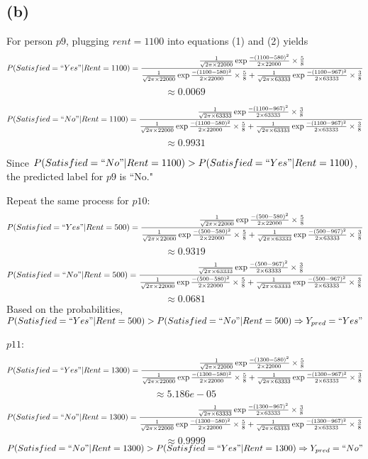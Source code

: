 \documentclass{article}
\begin{document}
\subsection{(b)}
For person $p9$, plugging $rent = 1100$ into equations (1) and (2) yields 
\[
P(Satisfied=``Yes"|Rent=1100) = \frac{\frac{1}{\sqrt{2\pi\times22000}}\exp{\frac{-(1100-580)^2}{2\times22000}}\times \frac{5}{8}}{\frac{1}{\sqrt{2\pi\times22000}}\exp{\frac{-(1100-580)^2}{2\times22000}}\times\frac{5}{8} + \frac{1}{\sqrt{2\pi\times63333}}\exp{\frac{-(1100-967)^2}{2\times63333}}\times\frac{3}{8}} \]\[\approx 0.0069 \]

\[P(Satisfied=``No"|Rent=1100) 
= \frac{\frac{1}{\sqrt{2\pi\times63333}}\exp{\frac{-(1100-967)^2}{2\times63333}}\times\frac{3}{8}}{ \frac{1}{\sqrt{2\pi\times22000}}\exp{\frac{-(1100-580)^2}{2\times22000}}\times\frac{5}{8} + \frac{1}{\sqrt{2\pi\times63333}}\exp{\frac{-(1100-967)^2}{2\times63333}}\times\frac{3}{8}}
\]\[\approx 0.9931\] 
\par Since $P(Satisfied=``No"|Rent=1100) > P(Satisfied=``Yes"|Rent=1100)$, the predicted label for $p9$ is ``No." 
\par Repeat the same process for $p10$:
\[
P(Satisfied=``Yes"|Rent=500) = \frac{\frac{1}{\sqrt{2\pi\times22000}}\exp{\frac{-(500-580)^2}{2\times22000}}\times \frac{5}{8}}{\frac{1}{\sqrt{2\pi\times22000}}\exp{\frac{-(500-580)^2}{2\times22000}}\times\frac{5}{8} + \frac{1}{\sqrt{2\pi\times63333}}\exp{\frac{-(500-967)^2}{2\times63333}}\times\frac{3}{8}} \]\[\approx 0.9319 \]
\[P(Satisfied=``No"|Rent=500) 
= \frac{\frac{1}{\sqrt{2\pi\times63333}}\exp{\frac{-(500-967)^2}{2\times63333}}\times\frac{3}{8}}{ \frac{1}{\sqrt{2\pi\times22000}}\exp{\frac{-(500-580)^2}{2\times22000}}\times\frac{5}{8} + \frac{1}{\sqrt{2\pi\times63333}}\exp{\frac{-(500-967)^2}{2\times63333}}\times\frac{3}{8}}
\]\[\approx 0.0681 \]
Based on the probabilities, $P(Satisfied=``Yes"|Rent=500) > P(Satisfied=``No"|Rent=500) \Rightarrow Y_{pred}=``Yes"$
\par $p11$: 
\[
P(Satisfied=``Yes"|Rent=1300) = \frac{\frac{1}{\sqrt{2\pi\times22000}}\exp{\frac{-(1300-580)^2}{2\times22000}}\times \frac{5}{8}}{\frac{1}{\sqrt{2\pi\times22000}}\exp{\frac{-(1300-580)^2}{2\times22000}}\times\frac{5}{8} + \frac{1}{\sqrt{2\pi\times63333}}\exp{\frac{-(1300-967)^2}{2\times63333}}\times\frac{3}{8}}
\]\[\approx 5.186e-05\]
\[P(Satisfied=``No"|Rent=1300) 
= \frac{\frac{1}{\sqrt{2\pi\times63333}}\exp{\frac{-(1300-967)^2}{2\times63333}}\times\frac{3}{8}}{ \frac{1}{\sqrt{2\pi\times22000}}\exp{\frac{-(1300-580)^2}{2\times22000}}\times\frac{5}{8} + \frac{1}{\sqrt{2\pi\times63333}}\exp{\frac{-(1300-967)^2}{2\times63333}}\times\frac{3}{8}}
\]\[\approx 0.9999 \]
$P(Satisfied=``No"|Rent=1300) > P(Satisfied=``Yes"|Rent=1300) \Rightarrow Y_{pred}=``No"$
\end{document}
